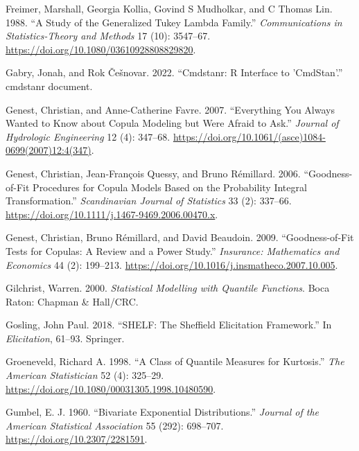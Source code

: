 \documentclass[
]{interact}
\newlength{\cslhangindent}
\newenvironment{CSLReferences}[2] %
 {\begin{list}{}{%
  \setlength{\itemindent}{0pt}
  \setlength{\leftmargin}{0pt}
  \setlength{\parsep}{0pt}
  \ifodd #1
   \setlength{\leftmargin}{\cslhangindent}
   \setlength{\itemindent}{-1\cslhangindent}
  \fi
  \setlength{\itemsep}{#2\baselineskip}}}
 {\end{list}}
\begin{document}
\begin{CSLReferences}{1}{0}
Freimer, Marshall, Georgia Kollia, Govind S Mudholkar, and C Thomas Lin.
1988. {``A Study of the Generalized {Tukey} Lambda Family.''}
\emph{Communications in Statistics-Theory and Methods} 17 (10):
3547--67. \url{https://doi.org/10.1080/03610928808829820}.

Gabry, Jonah, and Rok Češnovar. 2022. {``Cmdstanr: {R} Interface to
'{CmdStan}'.''} cmdstanr document.

Genest, Christian, and Anne-Catherine Favre. 2007. {``Everything {You
Always Wanted} to {Know} about {Copula Modeling} but {Were Afraid} to
{Ask}.''} \emph{Journal of Hydrologic Engineering} 12 (4): 347--68.
\url{https://doi.org/10.1061/(asce)1084-0699(2007)12:4(347)}.

Genest, Christian, Jean-François Quessy, and Bruno Rémillard. 2006.
{``Goodness-of-{Fit Procedures} for {Copula Models Based} on the
{Probability Integral Transformation}.''} \emph{Scandinavian Journal of
Statistics} 33 (2): 337--66.
\url{https://doi.org/10.1111/j.1467-9469.2006.00470.x}.

Genest, Christian, Bruno Rémillard, and David Beaudoin. 2009.
{``Goodness-of-Fit Tests for Copulas: {A} Review and a Power Study.''}
\emph{Insurance: Mathematics and Economics} 44 (2): 199--213.
\url{https://doi.org/10.1016/j.insmatheco.2007.10.005}.

Gilchrist, Warren. 2000. \emph{Statistical Modelling with Quantile
Functions}. Boca Raton: Chapman \& Hall/CRC.

Gosling, John Paul. 2018. {``{SHELF}: The {Sheffield} Elicitation
Framework.''} In \emph{Elicitation}, 61--93. Springer.

Groeneveld, Richard A. 1998. {``A {Class} of {Quantile Measures} for
{Kurtosis}.''} \emph{The American Statistician} 52 (4): 325--29.
\url{https://doi.org/10.1080/00031305.1998.10480590}.

Gumbel, E. J. 1960. {``Bivariate {Exponential Distributions}.''}
\emph{Journal of the American Statistical Association} 55 (292):
698--707. \url{https://doi.org/10.2307/2281591}.


\end{CSLReferences}
\end{document}
